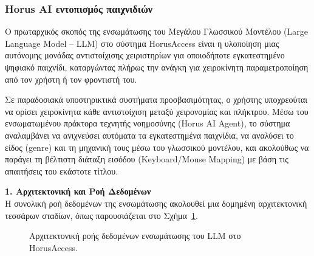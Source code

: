 \documentclass[twoside, a4paper, 11pt]{article}
\newcommand{\textlatin}[1]{\textenglish{#1}}
\begin{document}
\subsubsection{Horus AI εντοπισμός παιχνιδιών}

Ο πρωταρχικός σκοπός της ενσωμάτωσης του Μεγάλου Γλωσσικού Μοντέλου (Large Language Model -- LLM) στο σύστημα \textlatin{HorusAccess} είναι η υλοποίηση μιας αυτόνομης μονάδας αντιστοίχισης χειριστηρίων για οποιοδήποτε εγκατεστημένο ψηφιακό παιχνίδι, καταργώντας πλήρως την ανάγκη για χειροκίνητη παραμετροποίηση από τον χρήστη ή τον φροντιστή του.

Σε παραδοσιακά υποστηρικτικά συστήματα προσβασιμότητας, ο χρήστης υποχρεούται να ορίσει χειροκίνητα κάθε αντιστοίχιση μεταξύ χειρονομίας και πλήκτρου. Μέσω του ενσωματωμένου πράκτορα τεχνητής νοημοσύνης (\textlatin{Horus AI Agent}), το σύστημα αναλαμβάνει να ανιχνεύσει αυτόματα τα εγκατεστημένα παιχνίδια, να αναλύσει το είδος (\textlatin{genre}) και τη μηχανική τους μέσω του γλωσσικού μοντέλου, και ακολούθως να παράγει τη βέλτιστη διάταξη εισόδου (\textlatin{Keyboard/Mouse Mapping}) με βάση τις απαιτήσεις του εκάστοτε τίτλου.

\textbf{1. Αρχιτεκτονική και Ροή Δεδομένων}\\
Η συνολική ροή δεδομένων της ενσωμάτωσης ακολουθεί μια δομημένη αρχιτεκτονική τεσσάρων σταδίων, όπως παρουσιάζεται στο Σχήμα~\ref{fig:llm_flow}.

\begin{figure}[htbp]
    \centering
    \caption{Αρχιτεκτονική ροής δεδομένων ενσωμάτωσης του LLM στο HorusAccess.}
    \label{fig:llm_flow}
\end{figure}
\end{document}
